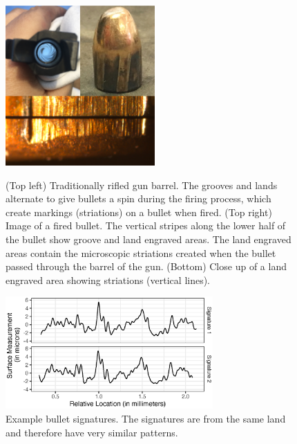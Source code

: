 \documentclass[AMS,STIX2COL]{WileyNJD-v2}\usepackage[]{graphicx}\usepackage[]{color}
\newenvironment{knitrout}{}{} %
\begin{document}
\begin{figure}[!t]
\centering
\begin{knitrout}
\color{fgcolor}

{\centering \includegraphics[width=2.25in]{figure-06-1} 

}



\end{knitrout}
\caption{(Top left) Traditionally rifled gun barrel. The grooves and lands alternate to give bullets a spin during the firing process, which create markings (striations) on a bullet when fired. (Top right) Image of a fired bullet. The vertical stripes along the lower half of the bullet show groove and land engraved areas. The land engraved areas contain the microscopic striations created when the bullet passed through the barrel of the gun. (Bottom) Close up of a land engraved area showing striations (vertical lines).}
\label{fig:figure-06}

\vspace*{\floatsep}

\begin{knitrout}
\color{fgcolor}

{\centering \includegraphics[width=3.125in]{figure-07-1} 

}



\end{knitrout}
\caption{Example bullet signatures. The signatures are from the same land and therefore have very similar patterns.}
\label{fig:figure-07}
\end{figure}
\end{document}
